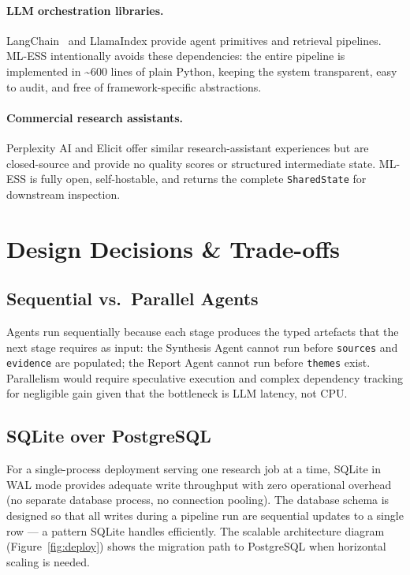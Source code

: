 \documentclass[10pt, twocolumn]{article}
\begin{document}
\paragraph{LLM orchestration libraries.}
LangChain~\cite{langchain} and LlamaIndex provide agent primitives and
retrieval pipelines. ML-ESS intentionally avoids these dependencies: the
entire pipeline is implemented in \textasciitilde{}600 lines of plain Python,
keeping the system transparent, easy to audit, and free of framework-specific
abstractions.

\paragraph{Commercial research assistants.}
Perplexity AI and Elicit offer similar research-assistant experiences but are
closed-source and provide no quality scores or structured intermediate state.
ML-ESS is fully open, self-hostable, and returns the complete
\texttt{SharedState} for downstream inspection.

\section{Design Decisions \& Trade-offs}

\subsection{Sequential vs.\ Parallel Agents}

Agents run sequentially because each stage produces the typed artefacts that
the next stage requires as input: the Synthesis Agent cannot run before
\texttt{sources} and \texttt{evidence} are populated; the Report Agent cannot
run before \texttt{themes} exist. Parallelism would require speculative
execution and complex dependency tracking for negligible gain given that the
bottleneck is LLM latency, not CPU.

\subsection{SQLite over PostgreSQL}

For a single-process deployment serving one research job at a time, SQLite in
WAL mode provides adequate write throughput with zero operational overhead (no
separate database process, no connection pooling). The database schema is
designed so that all writes during a pipeline run are sequential updates to a
single row — a pattern SQLite handles efficiently. The scalable architecture
diagram (Figure~\ref{fig:deploy}) shows the migration path to PostgreSQL when
horizontal scaling is needed.
\end{document}
